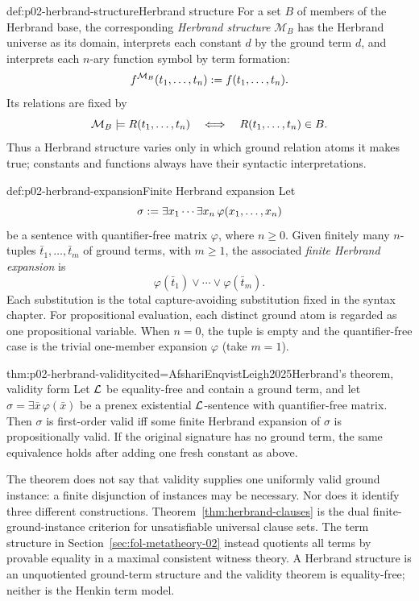 \begin{hbdefinition}{def:p02-herbrand-structure}{Herbrand structure}
For a set \(B\) of members of the Herbrand base, the corresponding
\emph{Herbrand structure} \(\mathcal M_B\) has the Herbrand universe as its
domain, interprets each constant \(d\) by the ground term \(d\), and interprets
each \(n\)-ary function symbol by term formation:
\[
 f^{\mathcal M_B}(t_1,\ldots,t_n)
   \mathrel{:=} f(t_1,\ldots,t_n).
\]
Its relations are fixed by
\[
 \mathcal M_B\models R(t_1,\ldots,t_n)
 \quad\Longleftrightarrow\quad
 R(t_1,\ldots,t_n)\in B.
\]
Thus a Herbrand structure varies only in which ground relation atoms it makes
true; constants and functions always have their syntactic interpretations.
\end{hbdefinition}

\begin{hbdefinition}{def:p02-herbrand-expansion}{Finite Herbrand expansion}
Let
\[
 \sigma\mathrel{:=}\exists x_1\cdots\exists x_n\,\varphi(x_1,\ldots,x_n)
\]
be a sentence with quantifier-free matrix \(\varphi\), where \(n\geq0\).  Given
finitely many \(n\)-tuples \(\bar t_1,\ldots,\bar t_m\) of ground terms, with
\(m\geq1\), the associated \emph{finite Herbrand expansion} is
\[
 \varphi(\bar t_1)\lor\cdots\lor\varphi(\bar t_m).
\]
Each substitution is the total capture-avoiding substitution fixed in the
syntax chapter.  For propositional evaluation, each distinct ground atom is
regarded as one propositional variable.  When \(n=0\), the tuple is empty and
the quantifier-free case is the trivial one-member expansion \(\varphi\) (take
\(m=1\)).
\end{hbdefinition}

\begin{hbtheorem}{thm:p02-herbrand-validity}{cited=AfshariEnqvistLeigh2025}{Herbrand's theorem, validity form}
Let \(\mathcal{L}\) be equality-free and contain a ground term, and let
\(\sigma=\exists\bar x\,\varphi(\bar x)\) be a prenex existential \(\mathcal{L}\)-sentence
with quantifier-free matrix.  Then \(\sigma\) is first-order valid iff some
finite Herbrand expansion of \(\sigma\) is propositionally valid.  If the
original signature has no ground term, the same equivalence holds after adding
one fresh constant as above.
\end{hbtheorem}

The theorem does not say that validity supplies one uniformly valid ground
instance: a finite disjunction of instances may be necessary.  Nor does it
identify three different constructions.  Theorem~\ref{thm:herbrand-clauses}
is the dual finite-ground-instance criterion for unsatisfiable universal clause
sets.  The term structure in Section~\ref{sec:fol-metatheory-02} instead quotients all
terms by provable equality in a maximal consistent witness theory.  A Herbrand
structure is an unquotiented ground-term structure and the validity theorem is
equality-free; neither is the Henkin term model.

